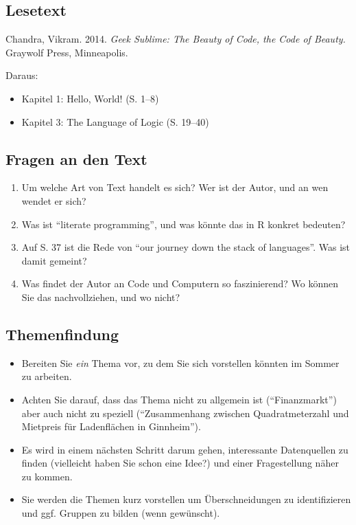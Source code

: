 \documentclass[
  ngerman,
]{article}
\providecommand{\tightlist}{%
  \setlength{\itemsep}{0pt}\setlength{\parskip}{0pt}}
\begin{document}
\hypertarget{lesetext-2}{%
\subsection{Lesetext}\label{lesetext-2}}

Chandra, Vikram. 2014. \emph{Geek Sublime: The Beauty of Code, the Code of Beauty.} Graywolf Press, Minneapolis.

Daraus:

\begin{itemize}
\tightlist
\item
  Kapitel 1: Hello, World! (S. 1--8)
\item
  Kapitel 3: The Language of Logic (S. 19--40)
\end{itemize}

\hypertarget{fragen-an-den-text-2}{%
\subsection{Fragen an den Text}\label{fragen-an-den-text-2}}

\begin{enumerate}
\def\labelenumi{\arabic{enumi}.}
\tightlist
\item
  Um welche Art von Text handelt es sich? Wer ist der Autor, und an wen wendet er sich?
\item
  Was ist ``literate programming'', und was könnte das in R konkret bedeuten?
\item
  Auf S. 37 ist die Rede von ``our journey down the stack of languages''. Was ist damit gemeint?
\item
  Was findet der Autor an Code und Computern so faszinierend? Wo können Sie das nachvollziehen, und wo nicht?
\end{enumerate}

\hypertarget{themenfindung}{%
\subsection{Themenfindung}\label{themenfindung}}

\begin{itemize}
\tightlist
\item
  Bereiten Sie \emph{ein} Thema vor, zu dem Sie sich vorstellen könnten im Sommer zu arbeiten.
\item
  Achten Sie darauf, dass das Thema nicht zu allgemein ist (``Finanzmarkt'') aber auch nicht zu speziell (``Zusammenhang zwischen Quadratmeterzahl und Mietpreis für Ladenflächen in Ginnheim'').
\item
  Es wird in einem nächsten Schritt darum gehen, interessante Datenquellen zu finden (vielleicht haben Sie schon eine Idee?) und einer Fragestellung näher zu kommen.
\item
  Sie werden die Themen kurz vorstellen um Überschneidungen zu identifizieren und ggf. Gruppen zu bilden (wenn gewünscht).
\end{itemize}
\end{document}
